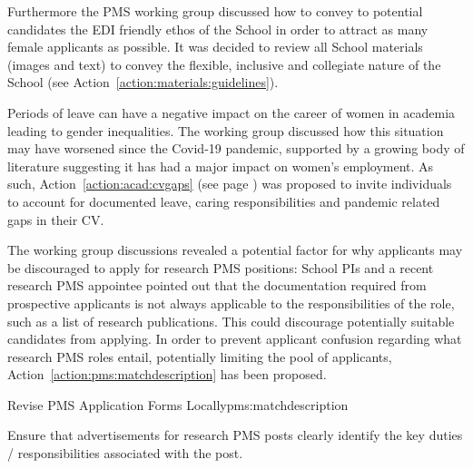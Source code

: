 Furthermore the PMS working group discussed how to convey to potential candidates the EDI friendly ethos of the School in order to attract as many female applicants as possible. It was decided to review all School materials (images and text) to convey the flexible, inclusive and collegiate nature of the School (see Action~\ref{action:materials:guidelines}). %

Periods of leave can have a negative impact on the career of women in academia leading to gender inequalities. The working group discussed how this situation may have worsened since the Covid-19 pandemic, supported by a growing body of literature suggesting it has had a major impact on women’s employment. As such, Action~\ref{action:acad:cvgaps} (see page \pageref{action:acad:cvgaps}) 
was proposed to invite individuals to account for documented leave, caring responsibilities and pandemic related gaps in their CV. 



The working group discussions revealed a potential factor for why applicants may be discouraged to apply for research PMS positions: School PIs and a recent research PMS appointee pointed out that the documentation required from prospective applicants is not always applicable to the responsibilities of the role, such as a list of research publications. 
This could discourage potentially suitable candidates from applying. 
In order to prevent applicant confusion regarding what research PMS roles entail, potentially limiting the pool of applicants, Action~\ref{action:pms:matchdescription} has been proposed. 

\newcommand{\actpmsmatch}{
Ensure that advertisements for research PMS posts clearly identify the key duties / responsibilities associated with the post. 
}

\begin{actionblock}{\ksspace{}Revise PMS Application Forms Locally}{pms:matchdescription}
\actpmsmatch
\hfill{
    \hypersetup{hidelinks}
    \hyperlink{d3}{\gotoactionsymbol{}}
}
\end{actionblock}


